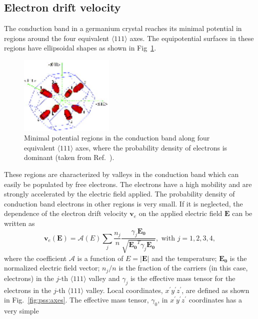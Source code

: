 \subsection{Electron drift velocity} 
\label{sec:pss:elec} 
The conduction band in a germanium crystal reaches its minimal
potential in regions around the four equivalent $\langle 111 \rangle$
axes. The equipotential surfaces in these regions have ellipsoidal
shapes as shown in Fig~\ref{fig:pss:valley}.
\begin{figure} 
\centering 
\includegraphics[width=0.4\textwidth]{valleys}   
\caption{Minimal potential regions in the conduction band along four
equivalent $\langle 111 \rangle$ axes, where the probability density
of electrons is dominant (taken from Ref.~\cite{bart}).}
\label{fig:pss:valley} 
\end{figure} 
These regions are characterized by valleys in the conduction band
which can easily be populated by free electrons. The electrons have a
high mobility and are strongly accelerated by the electric field
applied.  The probability density of conduction band electrons in
other regions is very small. If it is neglected, the dependence of the
electron drift velocity $\mathbf{v}_{e}$ on the applied electric field
$\mathbf{E}$ can be written as
\begin{equation} 
\label{eq:pss:ed} 
\mathbf{v}_{e}(\mathbf{E}) = \mathcal{A}(E) \sum_{j} \frac{n_{j}}{n} 
\frac{\gamma_{j}\mathbf{E_{0}}}
{\sqrt{\mathbf{E_{0}}^{T}\gamma_{j}\mathbf{E_{0}}}}, 
\mbox{ with } j=1,2,3,4, 
\end{equation} 
where the coefficient $\mathcal{A}$ is a function of $E=|\mathbf{E}|$
and the temperature; $\mathbf{E_{0}}$ is the normalized electric field
vector; $n_{j}/n$ is the fraction of the carriers (in this case,
electrons) in the $j$-th $\langle 111 \rangle$ valley and $\gamma_{j}$
is the effective mass tensor for the electrons in the $j$-th $\langle
111 \rangle$ valley. Local coordinates,
$x^{\prime}y^{\prime}z^{\prime}$, are defined as shown in
Fig.~\ref{fig:pss:axes}. The effective mass tensor, $\gamma_{0}$, in
$x^{\prime}y^{\prime}z^{\prime}$ coordinates has a very simple
